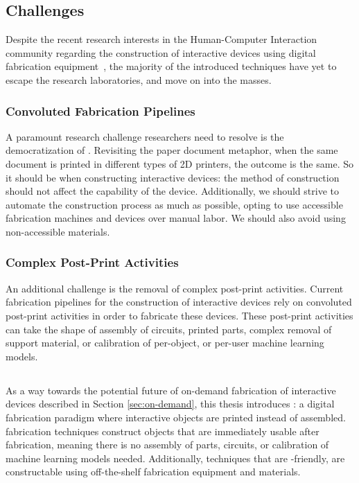     \subsection{Challenges}
      Despite the recent research interests in the Human-Computer Interaction
      community regarding the construction of interactive devices using digital
      fabrication equipment~\cite{Ballagas:2018}, the majority of the introduced
      techniques have yet to escape the research laboratories, and move on into
      the masses.

      \subsubsection*{Convoluted Fabrication Pipelines}
        A paramount research challenge researchers need to resolve is the
        democratization of . Revisiting the paper document
        metaphor, when the same document is printed in different types of 2D
        printers, the outcome is the same. So it should be when constructing
        interactive devices: the method of construction should not affect the
        capability of the device. Additionally, we should strive to automate the
        construction process as much as possible, opting to use accessible
        fabrication machines and devices over manual labor. We should also avoid
        using non-accessible materials.

      \subsubsection*{Complex Post-Print Activities}
        An additional challenge is the removal of complex post-print activities.
        Current fabrication pipelines for the construction of interactive
        devices rely on convoluted post-print activities in order to fabricate
        these devices. These post-print activities can take the shape of
        assembly of circuits, printed parts, complex removal of support
        material, or calibration of per-object, or per-user machine learning
        models.
      
    \subsection{\papf}
      As a way towards the potential future of on-demand fabrication of
      interactive devices described in Section \ref{sec:on-demand}, this thesis
      introduces \papf: a digital fabrication paradigm where interactive objects
      are printed instead of assembled. \pap fabrication techniques construct
      objects that are immediately usable after fabrication, meaning there is no
      assembly of parts, circuits, or calibration of machine learning models
      needed. Additionally, techniques that are \pap-friendly, are constructable
      using off-the-shelf fabrication equipment and materials.

